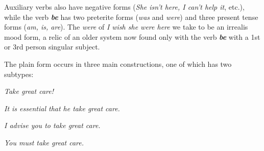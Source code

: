 \noindent Auxiliary verbs also have negative forms (\textit{She isn't here, I can't help it}, etc.), while the verb \textit{\textbf{be}} has two preterite forms (\textit{was} and \textit{were}) and three present tense forms (\textit{am, is, are}). The \textit{were} of \textit{I wish she were here} we take to be an irrealis mood form, a relic of an older system now found only with the verb \textit{\textbf{be}} with a 1st or 3rd person singular subject.

\newpage

The plain form occurs in three main constructions, one of which has two subtypes:

\newlength{\labwidthA}
\newlength{\labwidthB}
\begin{examples}
\item \label{ex:13}
    \begin{examples}
        \item \label{ex:13i} \hspace{1.7em}  \hspace{2.2em}\itshape Take great care!
        \item \label{ex:13ii} \hspace{1.7em}   \hspace{2.2em}\itshape It is essential \ob that he take great care\cb.
        \item \label{ex:13iii}
            \begin{examples}
                \item \label{ex:13iiia}  \itshape I advise you \ob to take great care\cb.
                \item \label{ex:13iiib}  \itshape You must \ob take great care\cb.
            \end{examples}
    \end{examples}
\end{examples}

